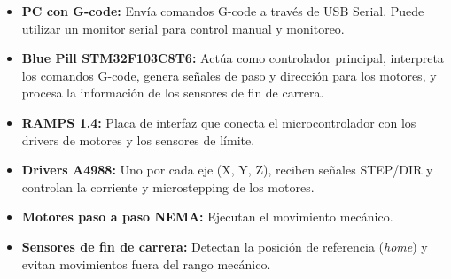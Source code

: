 \documentclass[12pt]{article}
\begin{document}
\begin{itemize}
    \item \textbf{PC con G-code:} Envía comandos G-code a través de USB Serial. Puede utilizar un monitor serial para control manual y monitoreo.
    \item \textbf{Blue Pill STM32F103C8T6:} Actúa como controlador principal, interpreta los comandos G-code, genera señales de paso y dirección para los motores, y procesa la información de los sensores de fin de carrera.
    \item \textbf{RAMPS 1.4:} Placa de interfaz que conecta el microcontrolador con los drivers de motores y los sensores de límite.
    \item \textbf{Drivers A4988:} Uno por cada eje (X, Y, Z), reciben señales STEP/DIR y controlan la corriente y microstepping de los motores.
    \item \textbf{Motores paso a paso NEMA:} Ejecutan el movimiento mecánico.
    \item \textbf{Sensores de fin de carrera:} Detectan la posición de referencia (\textit{home}) y evitan movimientos fuera del rango mecánico.
\end{itemize}

\end{document}
